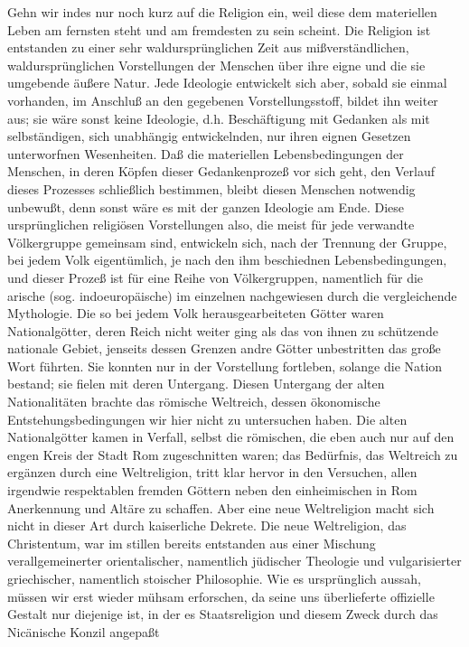 Gehn wir indes nur noch kurz auf die Religion ein, weil diese
dem materiellen Leben am fernsten steht und am fremdesten zu sein
scheint. Die Religion ist entstanden zu einer sehr waldursprünglichen
Zeit aus mißverständlichen, waldursprünglichen Vorstellungen der
Menschen über ihre eigne und die sie umgebende äußere Natur. Jede
Ideologie entwickelt sich aber, sobald sie einmal vorhanden, im Anschluß
an den gegebenen Vorstellungsstoff, bildet ihn weiter aus; sie wäre
sonst keine Ideologie, d.h. Beschäftigung mit Gedanken als mit
selbständigen, sich unabhängig entwickelnden, nur ihren eignen Gesetzen
unterworfnen Wesenheiten. Daß die materiellen Lebensbedingungen der
Menschen, in deren Köpfen dieser Gedankenprozeß vor sich geht, den
Verlauf dieses Prozesses schließlich bestimmen, bleibt diesen Menschen
notwendig unbewußt, denn sonst wäre es mit der ganzen Ideologie am Ende.
Diese ursprünglichen religiösen Vorstellungen also, die meist für jede
verwandte Völkergruppe gemeinsam sind, entwickeln sich, nach der
Trennung der Gruppe, bei jedem Volk eigentümlich, je nach den ihm
beschiednen Lebensbedingungen, und dieser Prozeß ist für eine Reihe von
Völkergruppen, namentlich für die arische (sog. indoeuropäische) im
einzelnen nachgewiesen durch die vergleichende Mythologie. Die so bei
jedem Volk herausgearbeiteten Götter waren Nationalgötter, deren Reich
nicht weiter ging als das von ihnen zu schützende nationale Gebiet,
jenseits dessen Grenzen andre Götter unbestritten das große Wort
führten. Sie konnten nur in der Vorstellung fortleben, solange die
Nation bestand; sie fielen mit deren Untergang. Diesen Untergang der
alten Nationalitäten brachte das römische Weltreich, dessen ökonomische
Entstehungsbedingungen wir hier nicht zu untersuchen haben. Die alten
Nationalgötter kamen in Verfall, selbst die römischen, die eben auch nur
auf den engen Kreis der Stadt Rom zugeschnitten waren; das Bedürfnis,
das Weltreich zu ergänzen durch eine Weltreligion, tritt klar hervor in
den Versuchen, allen irgendwie respektablen fremden Göttern neben den
einheimischen in Rom Anerkennung und Altäre zu schaffen. Aber eine neue
Weltreligion macht sich nicht in dieser Art durch kaiserliche Dekrete.
Die neue Weltreligion, das Christentum, war im stillen bereits
entstanden aus einer Mischung verallgemeinerter orientalischer,
namentlich jüdischer Theologie
und vulgarisierter griechischer, namentlich stoischer Philosophie. Wie
es ursprünglich aussah, müssen wir erst wieder mühsam erforschen, da
seine uns überlieferte offizielle Gestalt nur diejenige ist, in der es
Staatsreligion und diesem Zweck durch das Nicänische Konzil angepaßt
